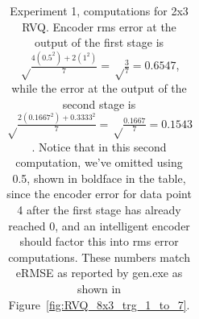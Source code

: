\begin{table}[t]
\begin{tabular}{|l||c|c|c|c|c|c|c|}
\end{tabular}
\caption{Experiment 1, computations for 2x3 RVQ.  Encoder rms error at the output of the first stage is {\color{blue}$\sqrt \frac{4(0.5^2) + 2(1^2)}{7} = \sqrt\frac{3}{7} = 0.6547$}, while the error at the output of the second stage is {\color{darkgreen}$\sqrt \frac{2(0.1667^2) + 0.3333^2}{7} = \sqrt\frac{0.1667}{7} = 0.1543$}.  Notice that in this second computation, we've omitted using 0.5, shown in boldface in the table, since the encoder error for data point 4 after the first stage has already reached 0, and an intelligent encoder should factor this into rms error computations.  These numbers match eRMSE as reported by gen.exe as shown in Figure~\ref{fig:RVQ_8x3_trg_1_to_7}.}
\label{table:Exp1_detailed_computations}
\end{table}




\clearpage
\newpage
\normalsize



